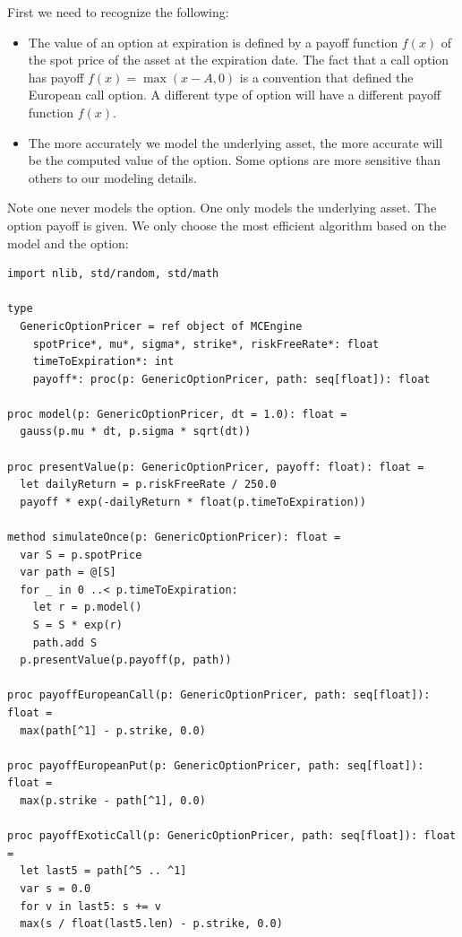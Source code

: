 \documentclass[justified, sixbynine]{tufte-book}
\def\ft{\small\tt}
\theoremstyle{plain}%
\newtheorem * {corollary}{Corollary}
\theoremstyle{definition}
\theoremstyle{remark}
\newtheorem * {remark}{Remark}
\newtheorem * {note}{Note}
\begin{document}
\begin{fullwidth}
First we need to recognize the following:

\begin{itemize}
\item  The value of an option at expiration is defined by a payoff function
$f(x)$ of the spot price of the asset at the expiration date. The fact that
a call option has payoff $f(x)=\max (x-A, 0)$ is a convention that defined the European call option.
A different type of option will have a different payoff function $f(x)$.

\item  The more accurately we model the underlying asset, the more accurate will be the computed value of the option. Some options are more sensitive than others to our modeling details.
\end{itemize}

Note one never models the option. One only models the underlying asset. The option payoff is given. We only choose the most efficient algorithm based on the model and the option:

\begin{lstlisting}[caption={in file: {\ft options.nim}}]
import nlib, std/random, std/math

type
  GenericOptionPricer = ref object of MCEngine
    spotPrice*, mu*, sigma*, strike*, riskFreeRate*: float
    timeToExpiration*: int
    payoff*: proc(p: GenericOptionPricer, path: seq[float]): float

proc model(p: GenericOptionPricer, dt = 1.0): float =
  gauss(p.mu * dt, p.sigma * sqrt(dt))

proc presentValue(p: GenericOptionPricer, payoff: float): float =
  let dailyReturn = p.riskFreeRate / 250.0
  payoff * exp(-dailyReturn * float(p.timeToExpiration))

method simulateOnce(p: GenericOptionPricer): float =
  var S = p.spotPrice
  var path = @[S]
  for _ in 0 ..< p.timeToExpiration:
    let r = p.model()
    S = S * exp(r)
    path.add S
  p.presentValue(p.payoff(p, path))

proc payoffEuropeanCall(p: GenericOptionPricer, path: seq[float]): float =
  max(path[^1] - p.strike, 0.0)

proc payoffEuropeanPut(p: GenericOptionPricer, path: seq[float]): float =
  max(p.strike - path[^1], 0.0)

proc payoffExoticCall(p: GenericOptionPricer, path: seq[float]): float =
  let last5 = path[^5 .. ^1]
  var s = 0.0
  for v in last5: s += v
  max(s / float(last5.len) - p.strike, 0.0)


\end{lstlisting}
\end{fullwidth}
\end{document}
